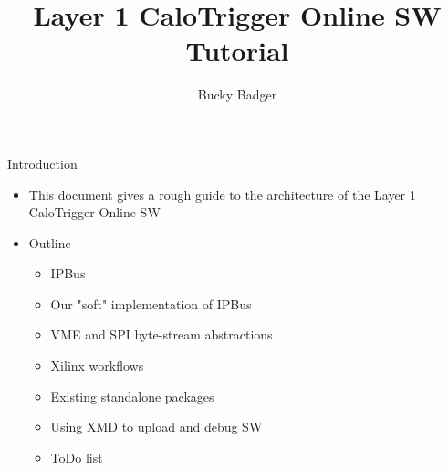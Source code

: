 \documentclass{beamer}
\title[UW Layer-1 SW Tutorial]{Layer 1 CaloTrigger Online SW Tutorial}
\author{Bucky Badger}
\institute{UW Madison}
\begin{document}
\begin{frame}
\titlepage
\end{frame}

\begin{frame}{Introduction}
\begin{itemize}
\item This document gives a rough guide to the architecture of the Layer 1 CaloTrigger Online SW
\item Outline
\begin{itemize}
\item IPBus
\item Our "soft" implementation of IPBus
\item VME and SPI byte-stream abstractions
\item Xilinx workflows
\item Existing standalone packages
\item Using XMD to upload and debug SW
\item ToDo list
\end{itemize}
\end{itemize}
\end{frame}
\end{document}

